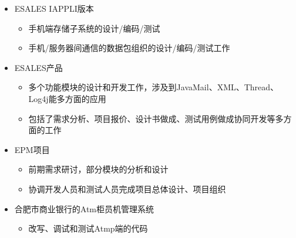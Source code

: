 \documentclass{resume}
\begin{document}
\begin{itemize}
  \item ESALES IAPPLI版本
  \begin{itemize}
    \item 手机端存储子系统的设计/编码/测试
    \item 手机/服务器间通信的数据包组织的设计/编码/测试工作
  \end{itemize}
  \item ESALES产品
  \begin{itemize}
    \item 多个功能模块的设计和开发工作，涉及到JavaMail、XML、Thread、Log4j能多方面的应用
    \item 包括了需求分析、项目报价、设计书做成、测试用例做成协同开发等多方面的工作
  \end{itemize}
  \item EPM项目
  \begin{itemize}
    \item 前期需求研讨，部分模块的分析和设计
    \item 协调开发人员和测试人员完成项目总体设计、项目组织
  \end{itemize}
\end{itemize}

\begin{itemize}
  \item 合肥市商业银行的Atm柜员机管理系统
  \begin{itemize}
    \item 改写、调试和测试Atmp端的代码
  \end{itemize}
\end{itemize}

%
%
\end{document}
